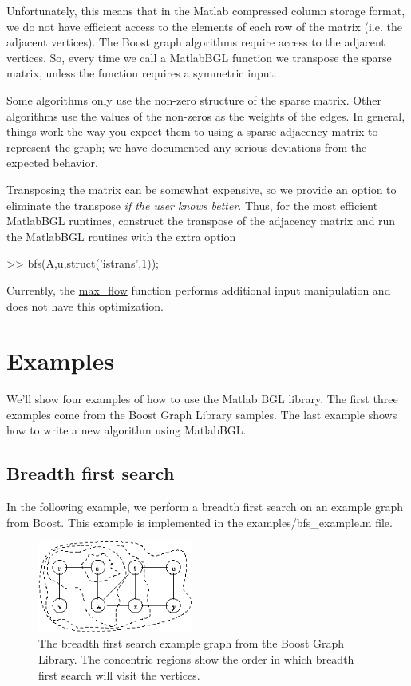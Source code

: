 \documentclass[12pt]{article}
\newcommand{\mycmd}[1]{\url{#1}}
\newcommand{\mypath}[1]{{\ttfamily \small #1}}
\begin{document}
Unfortunately, this means that in the Matlab compressed column storage format, we do not have efficient access to the elements of each row of the matrix (i.e. the adjacent vertices).  The Boost graph algorithms require access to the adjacent vertices.  So, every time we call a MatlabBGL function we transpose the sparse matrix, unless the function requires a symmetric input.

Some algorithms only use the non-zero structure of the sparse matrix.  Other algorithms use the values of the non-zeros as the weights of the edges.  In general, things work the way you expect them to using a sparse adjacency matrix to represent the graph; we have documented any serious deviations from the expected behavior.

Transposing the matrix can be somewhat expensive, so we provide an option to eliminate the transpose \emph{if the user knows better}.  Thus, for the most efficient MatlabBGL runtimes, construct the transpose of the adjacency matrix and run the MatlabBGL routines with the extra option 
\begin{mcode}
>> bfs(A,u,struct('istrans',1));
\end{mcode}

Currently, the \mycmd{max_flow} function performs additional input manipulation and does not have this optimization.  

\section{Examples}
We'll show four examples of how to use the Matlab BGL library.  The first three examples come from the Boost Graph Library samples.  The last example shows how to write a new algorithm using MatlabBGL.

\subsection{Breadth first search}

In the following example, we perform a breadth first search on an example graph from Boost.  This example is implemented in the \mypath{examples/bfs\_example.m} file.

\begin{figure}[ht!]
\centering
\includegraphics[width=2in]{bfs_example}
\caption{The breadth first search example graph from the Boost Graph Library.  The concentric regions show the order in which breadth first search will visit the vertices.}
\label{fig:bfs}
\end{figure}
\end{document}
